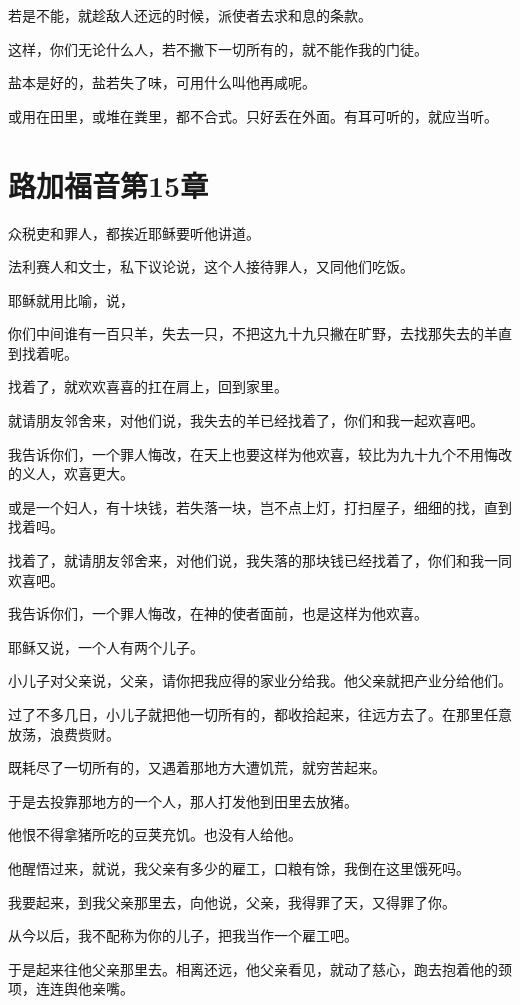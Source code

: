 \documentclass[12pt,oneside]{book}
\begin{document}
若是不能，就趁敌人还远的时候，派使者去求和息的条款。

这样，你们无论什么人，若不撇下一切所有的，就不能作我的门徒。

盐本是好的，盐若失了味，可用什么叫他再咸呢。

或用在田里，或堆在粪里，都不合式。只好丢在外面。有耳可听的，就应当听。

\chapter{路加福音第15章}
众税吏和罪人，都挨近耶稣要听他讲道。

法利赛人和文士，私下议论说，这个人接待罪人，又同他们吃饭。

耶稣就用比喻，说，

你们中间谁有一百只羊，失去一只，不把这九十九只撇在旷野，去找那失去的羊直到找着呢。

找着了，就欢欢喜喜的扛在肩上，回到家里。

就请朋友邻舍来，对他们说，我失去的羊已经找着了，你们和我一起欢喜吧。

我告诉你们，一个罪人悔改，在天上也要这样为他欢喜，较比为九十九个不用悔改的义人，欢喜更大。

或是一个妇人，有十块钱，若失落一块，岂不点上灯，打扫屋子，细细的找，直到找着吗。

找着了，就请朋友邻舍来，对他们说，我失落的那块钱已经找着了，你们和我一同欢喜吧。

我告诉你们，一个罪人悔改，在神的使者面前，也是这样为他欢喜。

耶稣又说，一个人有两个儿子。

小儿子对父亲说，父亲，请你把我应得的家业分给我。他父亲就把产业分给他们。

过了不多几日，小儿子就把他一切所有的，都收拾起来，往远方去了。在那里任意放荡，浪费赀财。

既耗尽了一切所有的，又遇着那地方大遭饥荒，就穷苦起来。

于是去投靠那地方的一个人，那人打发他到田里去放猪。

他恨不得拿猪所吃的豆荚充饥。也没有人给他。

他醒悟过来，就说，我父亲有多少的雇工，口粮有馀，我倒在这里饿死吗。

我要起来，到我父亲那里去，向他说，父亲，我得罪了天，又得罪了你。

从今以后，我不配称为你的儿子，把我当作一个雇工吧。

于是起来往他父亲那里去。相离还远，他父亲看见，就动了慈心，跑去抱着他的颈项，连连舆他亲嘴。
\end{document}
